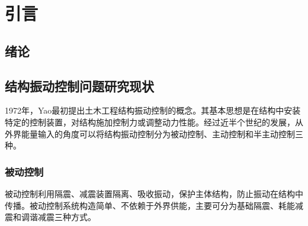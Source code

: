 \section{引言}
\subsection{绪论}
\subsection{结构振动控制问题研究现状}
1972年，Yao最初提出土木工程结构振动控制的概念\cite{yao1972concept}。其基本思想是在结构中安装特定的控制装置，对结构施加控制力或调整动力性能。经过近半个世纪的发展，从外界能量输入的角度可以将结构振动控制分为被动控制、主动控制和半主动控制三种。

\subsubsection{被动控制}
被动控制利用隔震、减震装置隔离、吸收振动，保护主体结构，防止振动在结构中传播。被动控制系统构造简单、不依赖于外界供能，主要可分为基础隔震、耗能减震和调谐减震三种方式。
